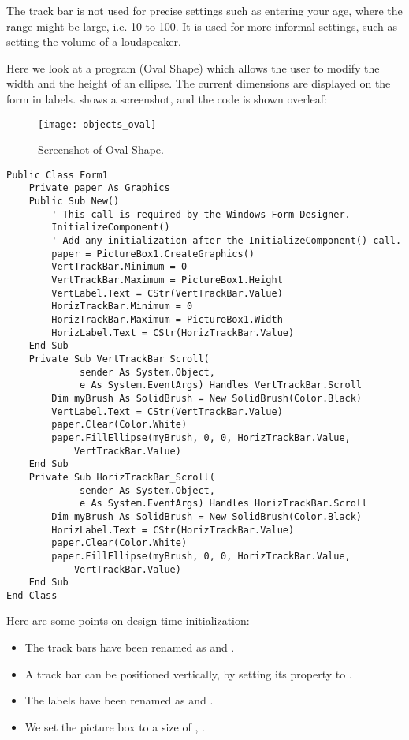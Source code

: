		The track bar is not used for precise settings such as entering your age, where the range might be large, i.e. 10 to 100. It is used for more informal settings, such as setting the volume of a loudspeaker.
		
		Here we look at a program (Oval Shape) which allows the user to modify the width and the height of an ellipse. The current dimensions are displayed on the form in labels.  shows a screenshot, and the code is shown overleaf:
		\begin{figure}[ht]
			\centering
			\texttt{[image: objects\_oval]}
			\caption{Screenshot of Oval Shape.}
			\label{fig:objects_oval}
		\end{figure}

		\begin{lstlisting}
Public Class Form1
	Private paper As Graphics
	Public Sub New()
		' This call is required by the Windows Form Designer.
		InitializeComponent()
		' Add any initialization after the InitializeComponent() call.
		paper = PictureBox1.CreateGraphics()
		VertTrackBar.Minimum = 0
		VertTrackBar.Maximum = PictureBox1.Height
		VertLabel.Text = CStr(VertTrackBar.Value)
		HorizTrackBar.Minimum = 0
		HorizTrackBar.Maximum = PictureBox1.Width
		HorizLabel.Text = CStr(HorizTrackBar.Value)
	End Sub
	Private Sub VertTrackBar_Scroll(
			 sender As System.Object,
			 e As System.EventArgs) Handles VertTrackBar.Scroll
		Dim myBrush As SolidBrush = New SolidBrush(Color.Black)
		VertLabel.Text = CStr(VertTrackBar.Value)
		paper.Clear(Color.White)
		paper.FillEllipse(myBrush, 0, 0, HorizTrackBar.Value,
			VertTrackBar.Value)
	End Sub
	Private Sub HorizTrackBar_Scroll(
			 sender As System.Object,
			 e As System.EventArgs) Handles HorizTrackBar.Scroll
		Dim myBrush As SolidBrush = New SolidBrush(Color.Black)
		HorizLabel.Text = CStr(HorizTrackBar.Value)
		paper.Clear(Color.White)
		paper.FillEllipse(myBrush, 0, 0, HorizTrackBar.Value,
			VertTrackBar.Value)
	End Sub
End Class
		\end{lstlisting}
		Here are some points on design-time initialization:
		\begin{itemize}
			\item The track bars have been renamed as  and .
			\item A track bar can be positioned vertically, by setting its  property to .
			\item The labels have been renamed as  and .
			\item We set the picture box to a size of \keyword{100}, .
		\end{itemize}
